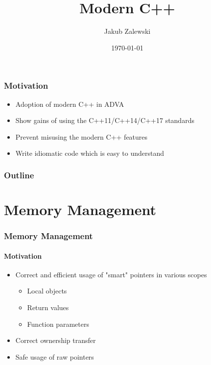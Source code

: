 \documentclass{beamer}
\title{Modern C++}
\author{Jakub Zalewski}
\institute{Adva Optical Networking}
\date{\today}
\begin{document}
\begin{frame}
	\titlepage
\end{frame}

\begin{frame}
\frametitle{Motivation}
    \begin{itemize}
        \pause
        \item Adoption of modern C++ in ADVA
        \pause
        \item Show gains of using the C++11/C++14/C++17 standards
        \pause
        \item Prevent misusing the modern C++ features
        \pause
        \item Write idiomatic code which is easy to understand
    \end{itemize}
\end{frame}

\begin{frame}
\frametitle{Outline}
\tableofcontents
\end{frame}

\section{Memory Management}

\begin{frame}
\frametitle{Memory Management}
\framesubtitle{Motivation}
    \begin{itemize}
        \item Correct and efficient usage of "smart" pointers in various scopes
            \begin{itemize}
                \item Local objects
                \item Return values
                \item Function parameters
            \end{itemize}
        \pause
        \item Correct ownership transfer
        \pause
        \item Safe usage of raw pointers
    \end{itemize}
\end{frame}
\end{document}
